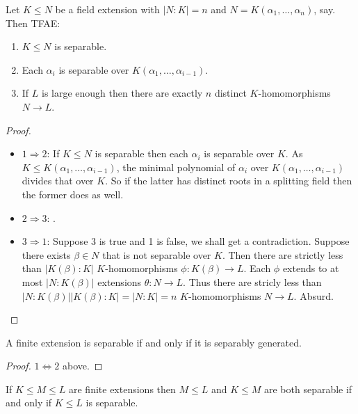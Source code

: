 \documentclass[a4paper]{article}
\begin{document}
\begin{theorem}\label{thm:separability of finite extension}
  Let \(K \leq N\) be a field extension with \(|N:K| = n\) and \(N = K(\alpha_1, \dots, \alpha_n)\), say. Then TFAE:
  \begin{enumerate}
  \item \(K \leq N\) is separable.
  \item Each \(\alpha_i\) is separable over \(K(\alpha_1, \dots, \alpha_{i - 1})\).
  \item If \(L\) is large enough then there are exactly \(n\) distinct \(K\)-homomorphisms \(N \to L\).
  \end{enumerate}
\end{theorem}

\begin{proof}\leavevmode
  \begin{itemize}
  \item \(1 \Rightarrow 2\): If \(K \leq N\) is separable then each \(\alpha_i\) is separable over \(K\). As \(K \leq K(\alpha_1, \dots, \alpha_{i - 1})\), the minimal polynomial of \(\alpha_i\) over \(K(\alpha_1, \dots, \alpha_{i - 1})\) divides that over \(K\). So if the latter has distinct roots in a splitting field then the former does as well.
  \item \(2 \Rightarrow 3\): .
  \item \(3 \Rightarrow 1\): Suppose 3 is true and 1 is false, we shall get a contradiction. Suppose there exists \(\beta \in N\) that is not separable over \(K\). Then there are strictly less than \(|K(\beta):K|\) \(K\)-homomorphisms \(\phi: K(\beta) \to L\). Each \(\phi\) extends to at most \(|N:K(\beta)|\) extensions \(\theta: N \to L\). Thus there are stricly less than \(|N:K(\beta)||K(\beta):K| = |N:K| = n\) \(K\)-homomorphisms \(N \to L\). Absurd.
  \end{itemize}
\end{proof}

\begin{corollary}
  A finite extension is separable if and only if it is separably generated.
\end{corollary}

\begin{proof}
  \(1 \Leftrightarrow 2\) above.
\end{proof}

\begin{lemma}\label{lem:transitivity of separability}
  If \(K \leq M \leq L\) are finite extensions then \(M \leq L\) and \(K \leq M\) are both separable if and only if \(K \leq L\) is separable.
\end{lemma}
\end{document}
